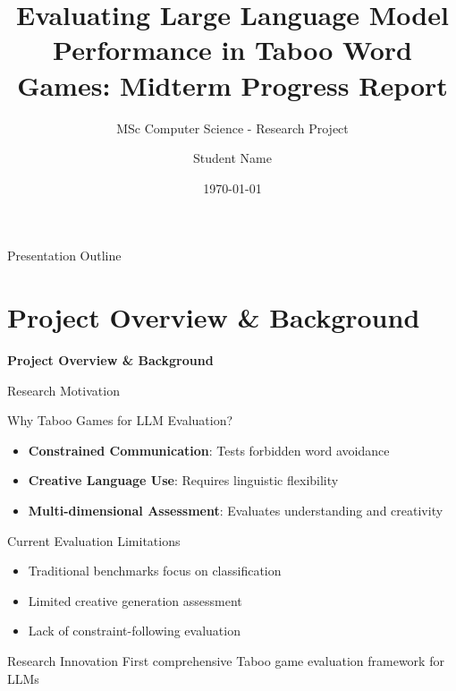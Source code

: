 \documentclass[aspectratio=169]{beamer}
\title[LLM Performance in Taboo Games: Midterm Progress]{Evaluating Large Language Model Performance in Taboo Word Games: Midterm Progress Report}
\subtitle{MSc Computer Science - Research Project}
\author{Student Name}
\institute{University Name}
\date{\today}
\begin{document}
\begin{frame}
\titlepage
\end{frame}

\begin{frame}{Presentation Outline}
\tableofcontents
\end{frame}

\section{Project Overview \& Background}

\begin{frame}
\begin{center}
\Huge \textbf{Project Overview \& Background}
\end{center}
\end{frame}

\begin{frame}{Research Motivation}
\begin{block}{Why Taboo Games for LLM Evaluation?}
\begin{itemize}
    \item \textbf{Constrained Communication}: Tests forbidden word avoidance
    \item \textbf{Creative Language Use}: Requires linguistic flexibility
    \item \textbf{Multi-dimensional Assessment}: Evaluates understanding and creativity
\end{itemize}
\end{block}

\begin{block}{Current Evaluation Limitations}
\begin{itemize}
    \item Traditional benchmarks focus on classification
    \item Limited creative generation assessment
    \item Lack of constraint-following evaluation
\end{itemize}
\end{block}

\begin{alertblock}{Research Innovation}
First comprehensive Taboo game evaluation framework for LLMs
\end{alertblock}
\end{frame}
\end{document}
